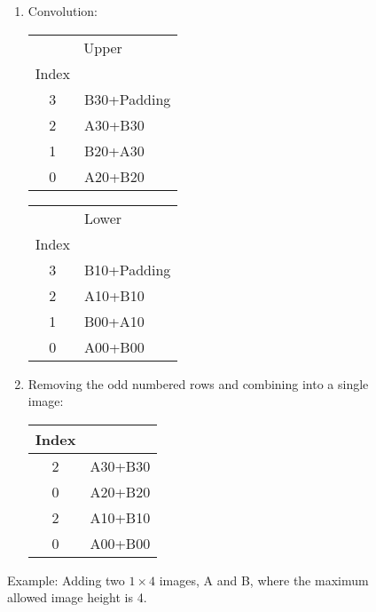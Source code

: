 \documentclass[12pt]{report}
\def\byX {\!\!\times\!\!}
\begin{document}
\begin{figure}[H]
\begin{mdframed}[style=default]
\begin{enumerate}
\item Convolution:
\begin{center}
\begin{tabular}{cl}
\multicolumn{2}{c}{Upper}\\
Index &\ \\
\hline
3 & B30+Padding\\
2 & A30+B30\\
1 & B20+A30\\
0 & A20+B20\\
\end{tabular}
\end{center}
\begin{center}
\begin{tabular}{cl}
\multicolumn{2}{c}{Lower}\\
Index &\ \\
\hline
3 & B10+Padding\\
2 & A10+B10\\
1 & B00+A10\\
0 & A00+B00\\
\end{tabular}
\end{center}
\item Removing the odd numbered rows and combining into a single image:
\begin{center}
\begin{tabular}{cl}
Index &\ \\
\hline
2 & A30+B30\\
0 & A20+B20\\
2 & A10+B10\\
0 & A00+B00\\
\end{tabular}
\end{center}
\end{enumerate}
\end{mdframed}
\caption{Example: Adding two $1\byX 4$ images, A and B, where the
  maximum allowed image height is 4.}
\end{figure}
\end{document}
